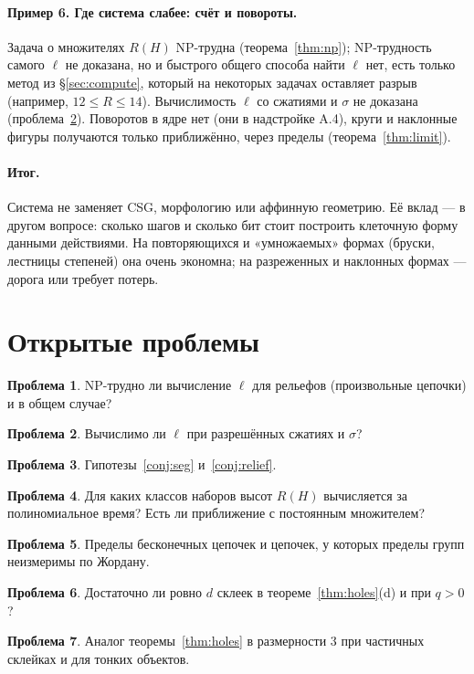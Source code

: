 \documentclass[11pt,a4paper]{article}
\theoremstyle{plain}
\theoremstyle{definition}
\newtheorem{problem}{Проблема}
\theoremstyle{remark}
\begin{document}
\paragraph{Пример 6. Где система слабее: счёт и повороты.} Задача о множителях $R(H)$ NP-трудна (теорема~\ref{thm:np}); NP-трудность самого $\ell$ не доказана, но и быстрого общего способа найти $\ell$ нет, есть только метод из §\ref{sec:compute}, который на некоторых задачах оставляет разрыв (например, $12\le R\le14$). Вычислимость $\ell$ со сжатиями и $\sigma$ не доказана (проблема~\ref{pr:dec}). Поворотов в ядре нет (они в надстройке A.4), круги и наклонные фигуры получаются только приближённо, через пределы (теорема~\ref{thm:limit}).

\paragraph{Итог.} Система не заменяет CSG, морфологию или аффинную геометрию. Её вклад — в другом вопросе: сколько шагов и сколько бит стоит построить клеточную форму данными действиями. На повторяющихся и «умножаемых» формах (бруски, лестницы степеней) она очень экономна; на разреженных и наклонных формах — дорога или требует потерь.

\section{Открытые проблемы}

\begin{problem}\label{pr:np}
NP-трудно ли вычисление $\ell$ для рельефов (произвольные цепочки) и в общем случае?
\end{problem}
\begin{problem}\label{pr:dec}
Вычислимо ли $\ell$ при разрешённых сжатиях и $\sigma$?
\end{problem}
\begin{problem}
Гипотезы~\ref{conj:seg} и~\ref{conj:relief}.
\end{problem}
\begin{problem}
Для каких классов наборов высот $R(H)$ вычисляется за полиномиальное время? Есть ли приближение с постоянным множителем?
\end{problem}
\begin{problem}
Пределы бесконечных цепочек и цепочек, у которых пределы групп неизмеримы по Жордану.
\end{problem}
\begin{problem}
Достаточно ли ровно $d$ склеек в теореме~\ref{thm:holes}(d) и при $q>0$?
\end{problem}
\begin{problem}
Аналог теоремы~\ref{thm:holes} в размерности 3 при частичных склейках и для тонких объектов.
\end{problem}
\end{document}
